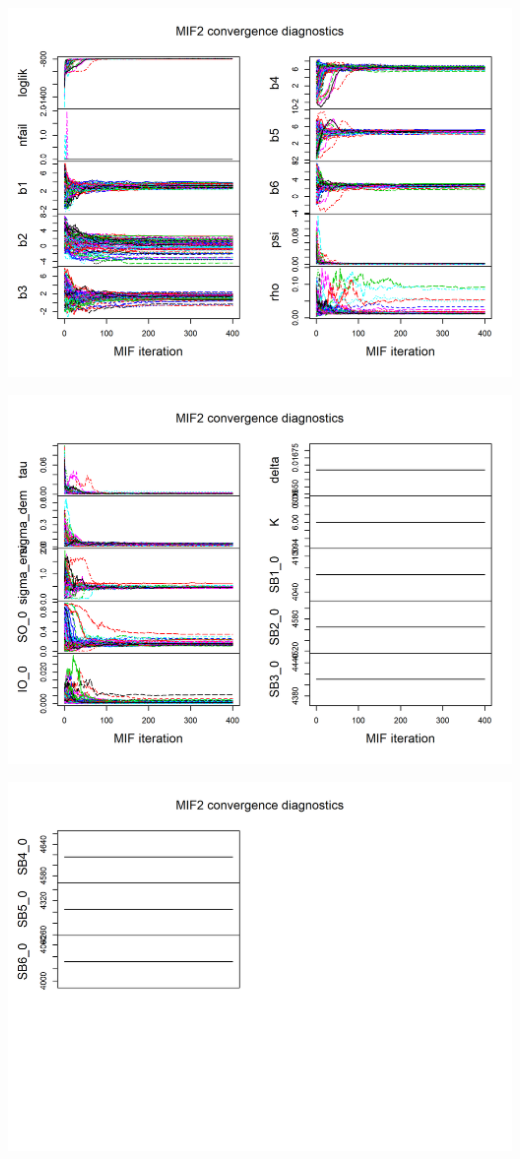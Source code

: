 \documentclass[]{article}
\begin{document}
\begin{center}\includegraphics{figure/sp500-mif_diagnostics-2} \end{center}

\begin{center}\includegraphics{figure/sp500-mif_diagnostics-3} \end{center}

\begin{center}\includegraphics{figure/sp500-mif_diagnostics-4} \end{center}
\end{document}
